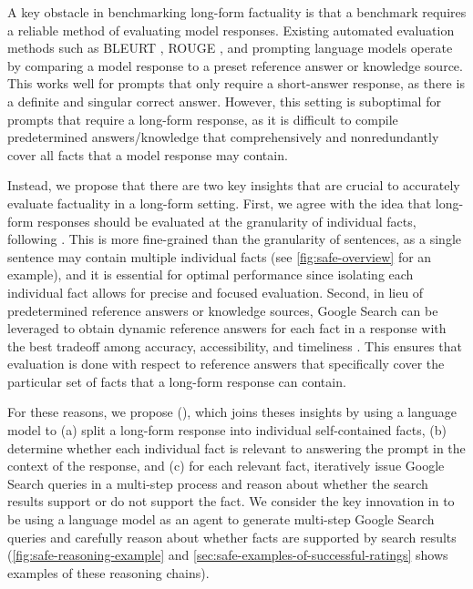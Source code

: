 \documentclass{article}
\theoremstyle{plain}
\theoremstyle{definition}
\theoremstyle{remark}
\begin{document}
A key obstacle in benchmarking long-form factuality is that a benchmark requires a reliable method of evaluating model responses.
Existing automated evaluation methods such as BLEURT \citep{sellam2020bleurt}, ROUGE \citep{lin2004rouge,ganesan2018rouge}, and prompting language models \citep{min2023factscore,vu2023freshllms} operate by comparing a model response to a preset reference answer or knowledge source.
This works well for prompts that only require a short-answer response, as there is a definite and singular correct answer.
However, this setting is suboptimal for prompts that require a long-form response, as it is difficult to compile predetermined answers/knowledge that comprehensively and nonredundantly cover all facts that a model response may contain.

Instead, we propose that there are two key insights that are crucial to accurately evaluate factuality in a long-form setting.
First, we agree with the idea that long-form responses should be evaluated at the granularity of individual facts, following \citet{min2023factscore}.
This is more fine-grained than the granularity of sentences, as a single sentence may contain multiple individual facts (see \cref{fig:safe-overview} for an example), and it is essential for optimal performance since isolating each individual fact allows for precise and focused evaluation.
Second, in lieu of predetermined reference answers or knowledge sources, Google Search can be leveraged to obtain dynamic reference answers for each fact in a response with the best tradeoff among accuracy, accessibility, and timeliness \citep{augenstein2023factuality}.
This ensures that evaluation is done with respect to reference answers that specifically cover the particular set of facts that a long-form response can contain.

For these reasons, we propose \safelong{} (\safe{}), which joins theses insights by using a language model to (a) split a long-form response into individual self-contained facts, (b) determine whether each individual fact is relevant to answering the prompt in the context of the response, and (c) for each relevant fact, iteratively issue Google Search queries in a multi-step process and reason about whether the search results support or do not support the fact.
We consider the key innovation in \safe{} to be using a language model as an agent to generate multi-step Google Search queries and carefully reason about whether facts are supported by search results (\cref{fig:safe-reasoning-example} and \cref{sec:safe-examples-of-successful-ratings} shows examples of these reasoning chains).
\end{document}
